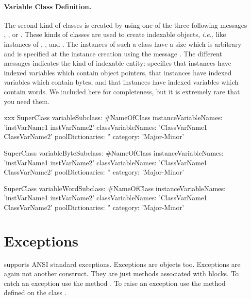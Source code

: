 \documentclass[a4paper,10pt,twoside]{book}
\begin{document}
\paragraph{Variable Class Definition.}
The second kind of classes is created by using one of the three following messages , , or  . These kinds of classes are used to create indexable objects, \textit{i.e.}, like instances of , , and . The instances of such a class have a size which is arbitrary and is specified at the instance creation using the message .
The different messages indicates the kind of indexable entity:  specifies that instances have indexed variables which contain object pointers,  that instances have indexed variables which contain bytes, and that instances have indexed variables which contain words.  We included here for completeness, but it is extremely rare that you need them. 

\begin{classdef}[xxx]{xxx}
SuperClass variableSubclass: #NameOfClass
    instanceVariableNames: 'instVarName1 instVarName2'
    classVariableNames: 'ClassVarName1 ClassVarName2'
    poolDictionaries: ''
    category: 'Major-Minor'
         
SuperClass variableByteSubclass: #NameOfClass
    instanceVariableNames: 'instVarName1 instVarName2'
    classVariableNames: 'ClassVarName1 ClassVarName2'
    poolDictionaries: ''
    category: 'Major-Minor'
         
SuperClass variableWordSubclass: #NameOfClass
    instanceVariableNames: 'instVarName1 instVarName2'
    classVariableNames: 'ClassVarName1 ClassVarName2'
    poolDictionaries: ''
    category: 'Major-Minor'
\end{classdef}


\section{Exceptions}


\sq supports ANSI standard exceptions. Exceptions are objects too. Exceptions are again not another construct. They are just methods associated with blocks. To catch an exception use the method . To raise an exception use the method  defined on the class .
\end{document}
